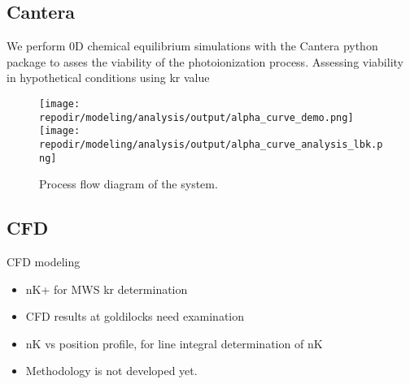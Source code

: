 \subsection{Cantera}

We perform 0D chemical equilibrium simulations with the Cantera python package to asses the viability of the photoionization process. 
Assessing viability in hypothetical conditions using kr value

\begin{figure}[h]
    \texttt{[image: \\repodir/modeling/analysis/output/alpha\_curve\_demo.png]} 
    \texttt{[image: \\repodir/modeling/analysis/output/alpha\_curve\_analysis\_lbk.png]} 
    \caption{Process flow diagram of the system.}
\end{figure}

\subsection{CFD}

CFD modeling 

\begin{itemize}
\item nK+ for MWS kr determination
\item CFD results at goldilocks need examination
\item nK vs position profile, for line integral determination of nK
\item Methodology is not developed yet. 
\end{itemize}

